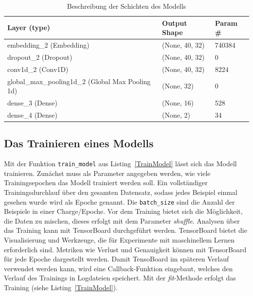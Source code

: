 \begin{table}[h]
    \caption{Beschreibung der Schichten des Modells}
    \label{modellBesch}
    \renewcommand{\arraystretch}{1.2}
    \centering
    \sffamily
    \begin{footnotesize}
        \begin{tabular}{l l l}
            \toprule
            \textbf{Layer (type)}                  & \textbf{Output Shape} & \textbf{Param \#} \\
            \midrule
            embedding\_2 (Embedding)  & (None, 40, 32) & 740384                \\
            dropout\_2 (Dropout)  & (None, 40, 32) &     0      \\
            conv1d\_2 (Conv1D)                  & (None, 40, 32)     &    8224     \\
            global\_max\_pooling1d\_2 (Global Max Pooling 1d)   & (None, 32)                    &     0   \\
            dense\_3 (Dense)    & (None, 16)     &  528      \\
            dense\_4 (Dense)   & (None, 2)     & 34                      \\
            \bottomrule
        \end{tabular}
    \end{footnotesize}
    \rmfamily
\end{table}

\subsection{Das Trainieren eines Modells}

Mit der Funktion \texttt{train\_model} aus Listing~\ref{TrainModel} lässt sich das Modell trainieren. Zunächst muss als Parameter angegeben werden, wie viele Trainingsepochen das Modell trainiert werden soll. Ein vollständiger Trainingsdurchlauf über den gesamten Datensatz, sodass jedes Beispiel einmal gesehen wurde wird als Epoche genannt. Die \texttt{batch\_size} sind die Anzahl der Beispiele in einer Charge/Epoche. Vor dem Training bietet sich die Möglichkeit, die Daten zu mischen, dieses erfolgt mit dem Parameter \textit{shuffle}. Analysen über das Training kann mit TensorBoard durchgeführt werden. TensorBoard bietet die Visualisierung und Werkzeuge, die für Experimente mit maschinellem Lernen erforderlich sind. Metriken wie Verlust und Genauigkeit können mit TensorBoard für jede Epoche dargestellt werden. Damit TensoBoard im späteren Verlauf verwendet werden kann, wird eine Callback-Funktion eingebaut, welches den Verlauf des Trainings in Logdateien speichert. Mit der \textit{fit}-Methode erfolgt das Training (siehe Listing~\ref{TrainModel}).


